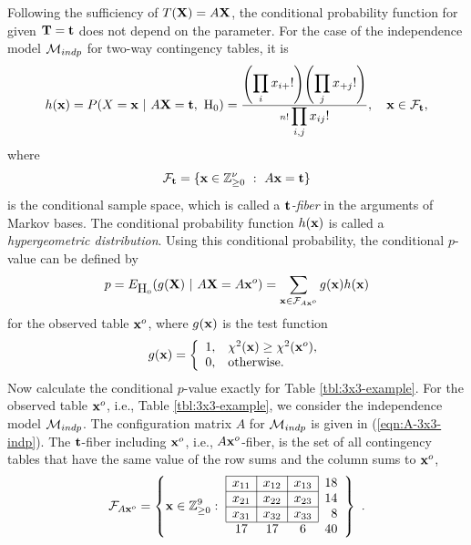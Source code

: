 \documentclass[12pt]{article}
\theoremstyle{definition}
\def\Bt{{\bf t}}
\def\Bx{{\bf x}}
\def\BX{{\bf X}}
\def\Bt{{\bf t}}
\def\BT{{\bf T}}
\begin{document}
Following the sufficiency of $T(\BX) = A\BX$, the conditional
probability function for given $\BT = \Bt$ does not depend on the
parameter. For the case of the independence model ${\cal M}_{indp}$ for
two-way contingency tables, it is 
\begin{equation}
\begin{array}{l}
 h(\Bx)  = P(X = \Bx\ |\ A\BX = \Bt, \ \mbox{H}_0) 
 = 
\frac{\left(\displaystyle\prod_{i}x_{i+}!\right)
\left(\displaystyle\prod_{j}x_{+j}!\right)}
{n!\displaystyle\prod_{i,j}x_{ij}!},\ \ \ \Bx \in {\cal F}_{\Bt},
\label{eqn:hyper-geo}
\end{array}\end{equation}
where
\[
 {\cal F}_{\Bt} = \{\Bx \in \mathbb{Z}_{\geq 0}^{\nu}\ :\ A\Bx = \Bt
\}
\]
is the conditional sample space, which is called a {\it $\Bt$-fiber}
in the arguments of Markov bases. The conditional probability function
$h(\Bx)$ is called a {\it hypergeometric distribution}. Using this
conditional probability, the conditional $p$-value can be defined by
\begin{equation}
p = E_{\mbox{H}_0}(g(\BX)\ |\ A\BX = A\Bx^o) =  \sum_{\Bx \in {\cal
 F}_{A\Bx^o}}g(\Bx)h(\Bx)
\label{eqn:exact-p-value}
\end{equation}
for the observed table $\Bx^o$, where $g(\Bx)$ is the test function
\[
 g(\Bx) = \left\{\begin{array}{ll}
1, & \chi^2(\Bx) \geq \chi^2(\Bx^o),\\
0, & \mbox{otherwise}.
\end{array}
\right.
\]
Now calculate the conditional $p$-value exactly for Table
\ref{tbl:3x3-example}. 
For the observed table $\Bx^o$, i.e., Table
\ref{tbl:3x3-example}, we consider the independence model ${\cal
M}_{indp}$. The configuration matrix $A$ for ${\cal M}_{indp}$ is given
in (\ref{eqn:A-3x3-indp}). 
The $\Bt$-fiber including $\Bx^o$, i.e.,
$A\Bx^o$-fiber, is the set of all contingency tables that have the same
value of the row sums and the column sums to $\Bx^o$, 
\[
{\cal F}_{A\Bx^o} = \left\{
\Bx\in \mathbb{Z}_{\geq 0}^9 :\  \begin{array}{|c|c|c|r}\cline{1-3}
x_{11} & x_{12}& x_{13}& 18\\ \cline{1-3}
x_{21} & x_{22}& x_{23}& 14\\ \cline{1-3}
x_{31} & x_{32}& x_{33}& 8\\ \cline{1-3}
\multicolumn{1}{c}{17} & \multicolumn{1}{c}{17} & \multicolumn{1}{c}{6} &
\multicolumn{1}{c}{40}
\end{array}
\right\}\ .
\]
\end{document}
